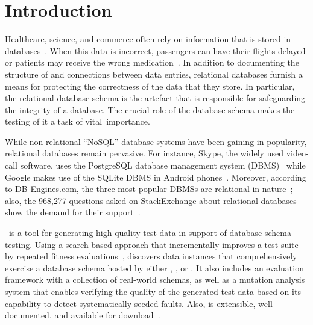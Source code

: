 \section{Introduction}\label{sec:intro}


Healthcare, science, and commerce often rely on information that is stored in
databases~\cite{kapfhammer2007comprehensive}.  When this data is incorrect, passengers can have their flights delayed or
patients may receive the wrong medication~\cite{databasebook}.  In addition to documenting the structure of and
connections between data entries, relational databases furnish a means for protecting the correctness of the data that
they store.  In particular, the relational database schema is the artefact that is responsible for safeguarding the
integrity of a database. The crucial role of the database schema makes the testing of it a task of \mbox{vital
importance}.


While non-relational ``NoSQL'' database systems have been gaining in popularity, relational databases remain pervasive.
For instance, Skype, the widely used video-call software, uses the PostgreSQL database management system
(DBMS)~\cite{postgres} while Google makes use of the SQLite DBMS in Android phones~\cite{sqlite}. Moreover, according to
DB-Engines.com, the three most popular DBMSs are relational in nature~\cite{dbrank}; also, the 968,277 questions asked
on StackExchange about relational databases show the demand for their support~\cite{stackexchange}.



\sa~is a tool for generating high-quality test data in support of database schema testing. Using a search-based approach
that incrementally improves a test suite by repeated fitness evaluations~\cite{Korel:AVM}, {\sa} discovers data
instances that comprehensively exercise a database schema hosted by either \hypersql, \postgresql, or \sqlite.  It also
includes an evaluation framework with a collection of real-world schemas, as well as a mutation analysis system that
enables verifying the quality of the generated test data based on its capability to detect systematically seeded faults.
Also, {\sa} is extensible, well documented, and available for download~\cite{tool}.

